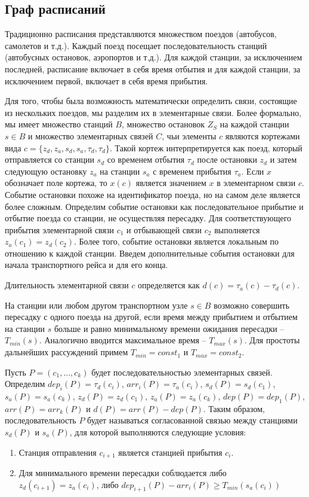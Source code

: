\subsection{Граф расписаний}
Традиционно расписания представляются множеством поездов (автобусов, самолетов и т.д.). Каждый поезд посещает последовательность станций (автобусных остановок, аэропортов и т.д.). Для каждой станции, за исключением последней, расписание включает в себя время отбытия и для каждой станции, за исключением первой, включает в себя время прибытия.

Для того, чтобы была возможность математически определить связи, состоящие из нескольких поездов, мы разделим их в элементарные связи. Более формально, мы имеет множество станций $B$, множество остановок $Z_S$ на каждой станции $s \in B$ и множество элементарных связей $C$, чьи элементы $c$ являются кортежами вида $c=\{z_d,z_a,s_d,s_a,\tau_d,\tau_d\}$. Такой кортеж интерпретируется как поезд, который отправляется со станции $s_d$ со временем отбытия $\tau_d$ после остановки $z_d$ и затем следующую остановку $z_a$ на станции $s_a$ с временем прибытия $\tau_a$. Если $x$ обозначает поле кортежа, то $x(c)$ является значением $x$ в элементарном связи $c$. Событие остановки похоже на идентификатор поезда, но на самом деле является более сложным. Определим событие остановки как последовательное прибытие и отбытие поезда со станции, не осуществляя пересадку. Для соответствующего прибытия элементарной связи $c_1$ и отбывающей связи $c_2$ выполняется $z_a(c_1)=z_d(c_2)$. Более того, событие остановки является локальным по отношению к каждой станции. Введем дополнительные события остановки для начала транспортного рейса и для его конца.

\begin{definition}
	Длительность элементарной связи $c$ определяется как $d(c)=\tau_a(c)-\tau_d(c)$.
\end{definition}

На станции или любом другом транспортном узле $s \in B$ возможно совершить пересадку с одного поезда на другой, если время между прибытием и отбытием на станции $s$ больше и равно минимальному времени ожидания пересадки -- $T_{min}(s)$. Аналогично вводится максимальное время -- $T_{max}(s)$. Для простоты дальнейших рассуждений примем $T_{min} = const_1$ и $T_{max} = const_2$.

Пусть $P=(c_1, ..., c_k)$ будет последовательностью элементарных связей. Определим $dep_i(P)=\tau_d(c_i)$, $arr_i(P)=\tau_a(c_i)$, $s_d(P)=s_d(c_1)$, $s_a(P)=s_a(c_k)$, $z_d(P)=z_d(c_1)$, $z_a(P)=z_a(c_k)$, $dep(P)=dep_1(P)$, $arr(P)=arr_k(P)$ и $d(P)=arr(P)-dep(P)$. Таким образом, последовательность $P$ будет называться согласованной связью между станциями $s_d(P)$ и $s_a(P)$, для которой выполняются следующие условия:
\begin{enumerate}
	\item Станция отправления $c_{i+1}$ является станцией прибытия $c_i$.
	\item Для минимального времени пересадки соблюдается либо $z_d(c_{i+1})=z_a(c_i)$, либо $dep_{i+1}(P)-arr_i(P) \geqslant T_{min}(s_a(c_i))$ 
\end{enumerate}

